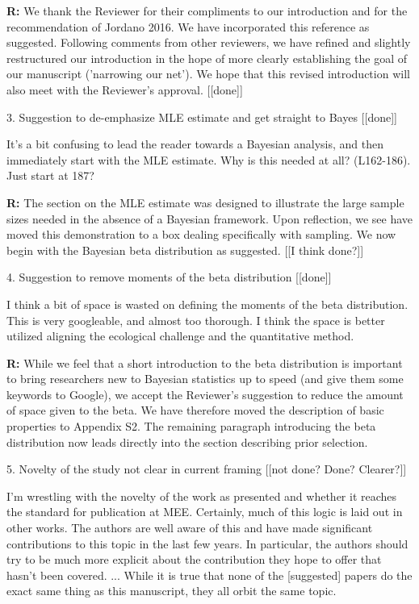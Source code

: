 \documentclass[12pt]{letter}
\newenvironment{refquote}{\bigskip \begin{it}}{\end{it}\smallskip}
\begin{document}
		\textbf{R:} We thank the Reviewer for their compliments to our introduction and for the recommendation of Jordano 2016. We have incorporated this reference as suggested. Following comments from other reviewers, we have refined and slightly restructured our introduction in the hope of more clearly establishing the goal of our manuscript ('narrowing our net'). We hope that this revised introduction will also meet with the Reviewer's approval. [[done]]


	3. Suggestion to de-emphasize MLE estimate and get straight to Bayes [[done]]

		\begin{refquote}
		It’s a bit confusing to lead the reader towards a Bayesian analysis, and then immediately start with the MLE estimate. Why is this needed at all? (L162-186). Just start at 187?
		\end{refquote}

		\textbf{R:} The section on the MLE estimate was designed to illustrate the large sample sizes needed in the absence of a Bayesian framework. Upon reflection, we see have moved this demonstration to a box dealing specifically with sampling. We now begin with the Bayesian beta distribution as suggested. [[I think done?]]


	4. Suggestion to remove moments of the beta distribution [[done]]

		\begin{refquote}
		I think a bit of space is wasted on defining the moments of the beta distribution. This is very googleable, and almost too thorough. I think the space is better utilized aligning the ecological challenge and the quantitative method.
		\end{refquote}

		\textbf{R:} While we feel that a short introduction to the beta distribution is important to bring researchers new to Bayesian statistics up to speed (and give them some keywords to Google), we accept the Reviewer's suggestion to reduce the amount of space given to the beta. We have therefore moved the description of basic properties to Appendix S2. The remaining paragraph introducing the beta distribution now leads directly into the section describing prior selection.


	5. Novelty of the study not clear in current framing [[not done? Done? Clearer?]]

		\begin{refquote}
		I’m wrestling with the novelty of the work as presented and whether it reaches the standard for publication at MEE. Certainly, much of this logic is laid out in other works. The authors are well aware of this and have made significant contributions to this topic in the last few years. In particular, the authors should try to be much more explicit about the contribution they hope to offer that hasn’t been covered. ...
		While it is true that none of the [suggested] papers do the exact same thing as this manuscript, they all	orbit the same topic. 
		\end{refquote}
\end{document}
